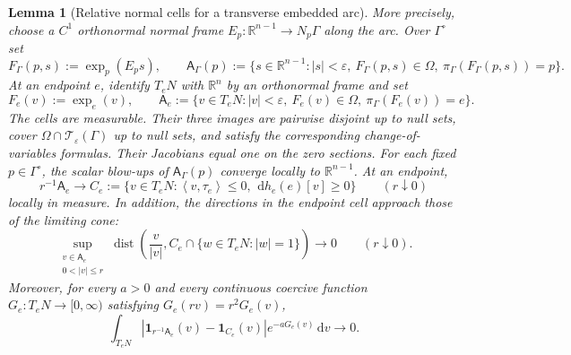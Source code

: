 \documentclass[11pt]{amsart}
\numberwithin{equation}{section}
\newtheorem{lemma}[theorem]{Lemma}
\theoremstyle{definition}
\theoremstyle{remark}
\DeclareMathOperator{\dist}{dist}
\newcommand{\R}{\mathbb{R}}
\newcommand{\ind}{\mathbf{1}}
\newcommand{\dd}{\,\mathrm{d}}
\newcommand{\eps}{\varepsilon}
\newcommand{\cT}{\mathcal{T}}
\newcommand{\Afib}{\mathsf{A}}
\newcommand{\inner}[2]{\left\langle #1,#2\right\rangle}
\begin{document}
\begin{lemma}[Relative normal cells for a transverse embedded arc]
More precisely, choose a $C^1$ orthonormal normal frame
$E_p:\R^{n-1}\to N_p\Gamma$ along the arc.  Over $\Gamma^\circ$ set
\[
 F_\Gamma(p,s):=\exp_p(E_p s),\qquad
 \Afib_\Gamma(p):=
 \{s\in\R^{n-1}:|s|<\eps,\ F_\Gamma(p,s)\in\Omega,\
                    \pi_\Gamma(F_\Gamma(p,s))=p\}.
\]
At an endpoint $e$, identify $T_eN$ with $\R^n$ by an orthonormal frame and set
\[
 F_e(v):=\exp_e(v),\qquad
 \Afib_e:=\{v\in T_eN:|v|<\eps,\ F_e(v)\in\Omega,\
                      \pi_\Gamma(F_e(v))=e\}.
\]
The cells are measurable.  Their three images are pairwise disjoint up to
null sets, cover $\Omega\cap\cT_\eps(\Gamma)$ up to null sets, and satisfy the
corresponding change-of-variables formulas.  Their Jacobians equal one on the
zero sections.
For each fixed $p\in\Gamma^\circ$, the scalar blow-ups of
$\Afib_\Gamma(p)$ converge locally to $\R^{n-1}$.  At an endpoint,
\begin{equation}\label{eq:transverse-arc-endpoint-cone}
 r^{-1}\Afib_e\longrightarrow
 C_e:=\{v\in T_eN:\inner{v}{\tau_e}\le0,\
                 \dd h_e(e)[v]\ge0\}
 \qquad(r\downarrow0)
\end{equation}
locally in measure.  In addition, the directions in the endpoint cell approach
those of the limiting cone:
\begin{equation}\label{eq:transverse-arc-directional-convergence}
 \sup_{\substack{v\in\Afib_e\\0<|v|\le r}}
 \dist\!\left(\frac{v}{|v|},
 C_e\cap\{w\in T_eN:|w|=1\}\right)\longrightarrow0
 \qquad(r\downarrow0).
\end{equation}
Moreover, for every $a>0$ and every continuous coercive function
$G_e:T_eN\to[0,\infty)$ satisfying $G_e(rv)=r^2G_e(v)$,
\begin{equation}\label{eq:transverse-arc-weighted-cell-limit}
 \int_{T_eN}
 \left|\ind_{r^{-1}\Afib_e}(v)-\ind_{C_e}(v)\right|
 e^{-aG_e(v)}\dd v\longrightarrow0.
\end{equation}
\end{lemma}
\end{document}
